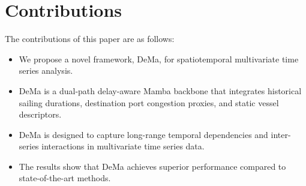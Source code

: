 \documentclass[12pt]{article}
\begin{document}
        \section{Contributions}
        The contributions of this paper are as follows:

        \begin{itemize}
        \item We propose a novel framework, DeMa, for spatiotemporal multivariate time series analysis.
        \item DeMa is a dual-path delay-aware Mamba backbone that integrates historical sailing durations, destination port congestion proxies, and static vessel descriptors.
        \item DeMa is designed to capture long-range temporal dependencies and inter-series interactions in multivariate time series data.
        \item The results show that DeMa achieves superior performance compared to state-of-the-art methods.
        \end{itemize}

        
        

        
\end{document}
